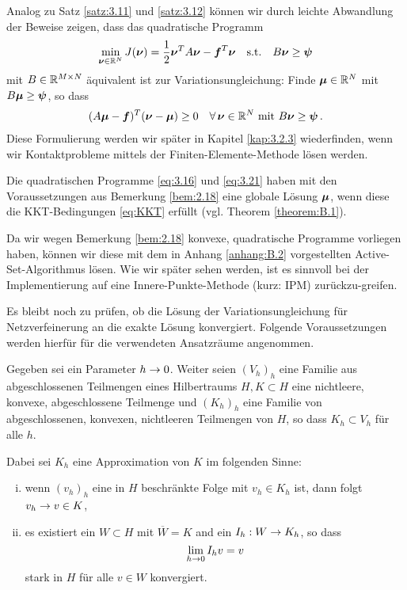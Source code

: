 \begin{bem}\label{bem:3.13}
Analog zu Satz \ref{satz:3.11} und \ref{satz:3.12} können wir durch leichte Abwandlung der Beweise zeigen, dass das quadratische Programm
\begin{align}\label{eq:3.21}
	\min_{\boldsymbol\nu \in \mathbb{R}^N} J(\boldsymbol\nu) = \frac 1 2 \boldsymbol \nu^T A \boldsymbol \nu - \boldsymbol f^T \boldsymbol \nu \quad \text{s.t.} \quad B\boldsymbol\nu \ge \boldsymbol \psi
\end{align}
mit $B \in \mathbb{R}^{M\times N}$ äquivalent ist zur Variationsungleichung: Finde $\boldsymbol\mu \in \mathbb{R}^N$ mit $B\boldsymbol\mu \ge \boldsymbol \psi$, so dass
\begin{align}\label{eq:3.22}
	(A\boldsymbol\mu - \boldsymbol f)^T (\boldsymbol\nu-\boldsymbol\mu) \ge 0 \quad \forall\, \boldsymbol\nu \in \mathbb{R}^N \text{ mit } B \boldsymbol \nu \ge \boldsymbol\psi \, .
\end{align}
Diese Formulierung werden wir später in Kapitel \ref{kap:3.2.3} wiederfinden, wenn wir Kontaktprobleme mittels der Finiten-Elemente-Methode lösen werden.
\end{bem}


\begin{bem}\label{bem:3.14}
Die quadratischen Programme \eqref{eq:3.16} und \eqref{eq:3.21} haben mit den Voraussetzungen aus Bemerkung \ref{bem:2.18} eine globale Lösung $\boldsymbol\mu$, wenn diese die KKT-Bedingungen \eqref{eq:KKT} erfüllt (vgl. Theorem \ref{theorem:B.1}).
\end{bem}


Da wir wegen Bemerkung \ref{bem:2.18} konvexe, quadratische Programme vorliegen haben, können wir diese mit dem in Anhang \ref{anhang:B.2} vorgestellten Active-Set-Algorithmus lösen. Wie wir später sehen werden, ist es sinnvoll bei der Implementierung auf eine Innere-Punkte-Methode (kurz: IPM) zurückzu-greifen.

Es bleibt noch zu prüfen, ob die Lösung der Variationsungleichung für Netzverfeinerung an die exakte Lösung konvergiert. Folgende Voraussetzungen werden hierfür für die verwendeten Ansatzräume angenommen.


\begin{vor}\label{vor:3.15}
Gegeben sei ein Parameter $h \rightarrow 0$. Weiter seien $(V_h)_h$ eine Familie aus abgeschlossenen Teilmengen eines Hilbertraums $H,  K \subset H$ eine nichtleere, konvexe, abgeschlossene Teilmenge und $(K_h)_h$ eine Familie von abgeschlossenen, konvexen, nichtleeren Teilmengen von $H$, so dass $K_h \subset V_h$ für alle $h$.

Dabei sei $K_h$ eine Approximation von $K$ im folgenden Sinne:
\begin{enumerate}[(i)]
\item wenn $(v_h)_h$ eine in $H$ beschränkte Folge mit $v_h \in K_h$ ist, dann folgt $v_h \rightarrow v \in K$,
\item es existiert ein $W \subset H$ mit $\overline W = K$ and ein $I_h: W \rightarrow K_h$, so dass
\[
	\lim_{h\rightarrow 0} I_h v = v
\]
stark in $H$ für alle $v \in W$ konvergiert.
\end{enumerate}
\end{vor}


